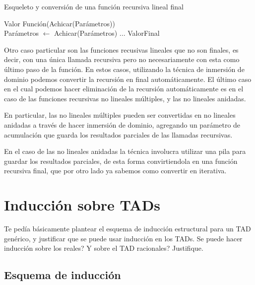 \documentclass[10pt,a4paper,notitlepage]{article}
\begin{document}
\begin{algorithm}
\caption{Esqueleto y conversión de una función recursiva lineal final}\label{elimRecLinFinal1}
\begin{algorithmic}[1]
	\State \Return Valor
\Else
	\State \Return Función(Achicar(Parámetros))
\EndIf
\EndProcedure
\\
	\State Parámetros $\gets$ Achicar(Parámetros)
\EndWhile
\State ...
\State \Return ValorFinal
\EndProcedure
\end{algorithmic}
\end{algorithm}

Otro caso particular son las funciones recusivas lineales que no son finales, es decir, con una única llamada recursiva pero no necesariamente con esta como último paso de la función. En estos casos, utilizando la técnica de inmersión de dominio podemos convertir la recursión en final automáticamente. El último caso en el cual podemos hacer eliminación de la recursión automáticamente es en el caso de las funciones recursivas no lineales múltiples, y las no lineales anidadas.

En particular, las no lineales múltiples pueden ser convertidas en no lineales anidadas a través de hacer inmersión de dominio, agregando un parámetro de acumulación que guarda los resultados parciales de las llamadas recursivas.


En el caso de las no lineales anidadas la técnica involucra utilizar una pila para guardar los resultados parciales, de esta forma convirtiendola en una función recursiva final, que por otro lado ya sabemos como convertir en iterativa.

\section{Inducción sobre TADs}

Te pedía básicamente plantear el esquema de inducción estructural para un TAD genérico, y justificar que se puede usar inducción en los TADs.
Se puede hacer inducción sobre los reales? Y sobre el TAD racionales? Justifique.

\subsection{Esquema de inducción}
\end{document}
